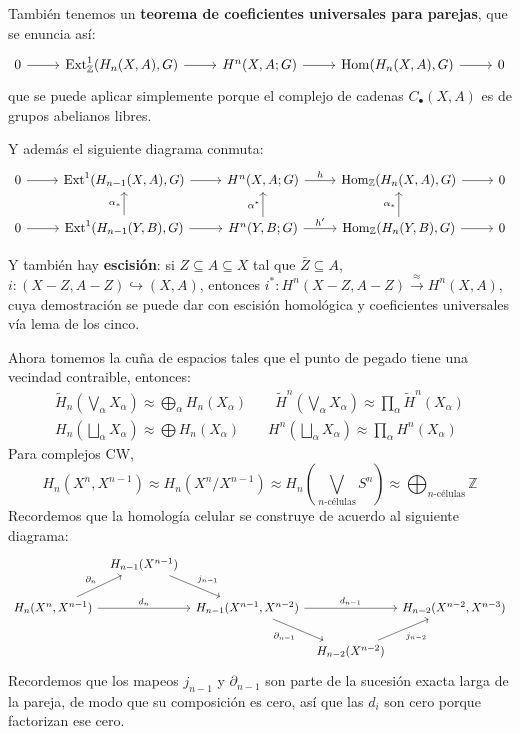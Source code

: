 \documentclass[spanish]{book}
\theoremstyle{definition}
\newcommand{\Z}{\mathbb{Z}}
\DeclareMathOperator{\Hom}{Hom}
\DeclareMathOperator{\Ext}{Ext}
\begin{document}
También tenemos un \textbf{teorema de coeficientes universales para parejas}, que se enuncia así:
\[\begin{tikzcd}
	0\arrow[r]&\Ext_\Z^1(H_n(X,A),G)\arrow[r]&H^n(X,A;G)\arrow[r]&\Hom(H_n(X,A),G)\arrow[r]&0
\end{tikzcd}\]
que se puede aplicar simplemente porque el complejo de cadenas $C_\bullet(X,A)$ es de grupos abelianos libres.

Y además el siguiente diagrama conmuta:
\[\begin{tikzcd}
	0\arrow[r]&\Ext^1(H_{n-1}(X,A),G)\arrow[r]&H^n(X,A;G)\arrow[r,"h"]&\Hom_\Z(H_n(X,A),G)\arrow[r]&0\\
	0\arrow[r]&\Ext^1(H_{n-1}(Y,B),G)\arrow[r]\arrow[u,"\alpha_*"]&H^n(Y,B;G)\arrow[r,"h'"]\arrow[u,"\alpha^*"]&\Hom_\Z(H_n(Y,B),G)\arrow[r]\arrow[u,"\alpha_*"]&0
\end{tikzcd}\]

Y también hay \textbf{escisión}: si $Z\subseteq A\subseteq X$ tal que $\bar{Z}\subseteq A$, $i: (X-Z,A-Z)\hookrightarrow (X,A)$, entonces $i^*:H^n(X-Z,A-Z)\xrightarrow{\approx}H^n(X,A)$, cuya demostración se puede dar con escisión homológica y coeficientes universales vía lema de los cinco.

Ahora tomemos la cuña de espacios tales que el punto de pegado tiene una vecindad contraible, entonces:
\begin{align*}
	\tilde{H}_n\left(\bigvee_\alpha X_\alpha\right)\approx\bigoplus_\alpha H_n(X_\alpha)\qquad\tilde{H}^n\left(\bigvee_\alpha X_\alpha\right)\approx\prod_\alpha\tilde{H}^n(X_\alpha)\\
	H_n\left(\bigsqcup_\alpha X_\alpha\right)\approx\bigoplus H_n(X_\alpha)\qquad H^n\left(\bigsqcup_\alpha X_\alpha\right)\approx\prod_\alpha H^n(X_\alpha)
\end{align*}
Para complejos CW,
\[H_n(X^{n},X^{n-1})\approx H_n(X^{n}/X^{n-1})\approx H_n\left(\bigvee_{n\text{-células}}S^n\right)\approx\bigoplus_{n\text{-células}}\Z\]
Recordemos que la homología celular se construye de acuerdo al siguiente diagrama:
\[\begin{tikzcd}[column sep=tiny]
	& H_{n-1}(X^{n-1}) \arrow[rd, "j_{n-1}"] \\
	H_n(X^n, X^{n-1}) \arrow[ru, "\partial_n"] \arrow[rr, "d_n"] && H_{n-1}(X^{n-1}, X^{n-2}) \arrow[rd,swap, "\partial_{n-1}"] \arrow[rr, "d_{n-1}"] && H_{n-2}(X^{n-2}, X^{n-3}) \\
	& && H_{n-2}(X^{n-2}) \arrow[ru,swap, "j_{n-2}"]
\end{tikzcd}\]
Recordemos que los mapeos $j_{n-1}$ y $\partial_{n-1}$ son parte de la sucesión exacta larga de la pareja, de modo que su composición es cero, así que las $d_i$ son cero porque factorizan ese cero.
\end{document}
